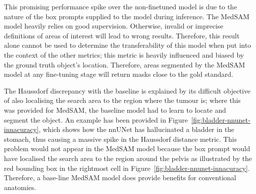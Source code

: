 \documentclass[12pt,twoside]{report}
\begin{document}
\begin{table}[h!]
  \centering
  \caption{Performance of models on the bladder delineation.}
  \label{tab:medsam-bladder-performance}
\end{table}

This promising performance spike over the non-finetuned model is due to the nature of the box prompts supplied to the model during inference. The MedSAM model heavily relies on good supervision. Otherwise, invalid or imprecise definitions of areas of interest will lead to wrong results. Therefore, this result alone cannot be used to determine the transferability of this model when put into the context of the other metrics; this metric is heavily influenced and biased by the ground truth object's location. Therefore, areas segmented by the MedSAM model at any fine-tuning stage will return masks close to the gold standard.

The Haussdorf discrepancy with the baseline is explained by its difficult objective of also localising the search area to the region where the tumour is; where this was provided for MedSAM, the baseline model had to learn to locate and segment the object. An example has been provided in Figure~\ref{fig:bladder-nnunet-innacuracy}, which shows how the nnUNet has hallucinated a bladder in the stomach, thus causing a massive spike in the Haussdorf distance metric. This problem would not appear in the MedSAM model because the box prompt would have localised the search area to the region around the pelvis as illustrated by the red bounding box in the rightmost cell in Figure~\ref{fig:bladder-nnunet-innacuracy}. Therefore, a base-line MedSAM model does provide benefits for conventional anatomies.
\end{document}
